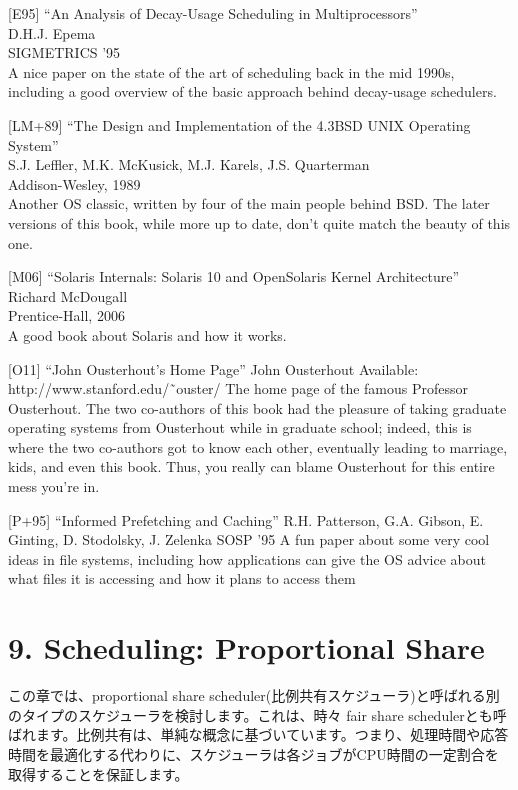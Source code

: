 {[}E95{]} ``An Analysis of Decay-Usage Scheduling in Multiprocessors''\\
D.H.J. Epema\\
SIGMETRICS '95\\
A nice paper on the state of the art of scheduling back in the mid
1990s, including a good overview of the basic approach behind
decay-usage schedulers.

{[}LM+89{]} ``The Design and Implementation of the 4.3BSD UNIX Operating
System''\\
S.J. Leffler, M.K. McKusick, M.J. Karels, J.S. Quarterman\\
Addison-Wesley, 1989\\
Another OS classic, written by four of the main people behind BSD. The
later versions of this book, while more up to date, don't quite match
the beauty of this one.

{[}M06{]} ``Solaris Internals: Solaris 10 and OpenSolaris Kernel
Architecture''\\
Richard McDougall\\
Prentice-Hall, 2006\\
A good book about Solaris and how it works.

{[}O11{]} ``John Ousterhout's Home Page'' John Ousterhout Available:
http://www.stanford.edu/˜ouster/ The home page of the famous Professor
Ousterhout. The two co-authors of this book had the pleasure of taking
graduate operating systems from Ousterhout while in graduate school;
indeed, this is where the two co-authors got to know each other,
eventually leading to marriage, kids, and even this book. Thus, you
really can blame Ousterhout for this entire mess you're in.

{[}P+95{]} ``Informed Prefetching and Caching'' R.H. Patterson, G.A.
Gibson, E. Ginting, D. Stodolsky, J. Zelenka SOSP '95 A fun paper about
some very cool ideas in file systems, including how applications can
give the OS advice about what files it is accessing and how it plans to
access them

\newpage

\hypertarget{scheduling-proportional-share}{%
\section*{9. Scheduling: Proportional
Share}\label{scheduling-proportional-share}}

この章では、proportional share
scheduler(比例共有スケジューラ)と呼ばれる別のタイプのスケジューラを検討します。これは、時々
fair share
schedulerとも呼ばれます。比例共有は、単純な概念に基づいています。つまり、処理時間や応答時間を最適化する代わりに、スケジューラは各ジョブがCPU時間の一定割合を取得することを保証します。

